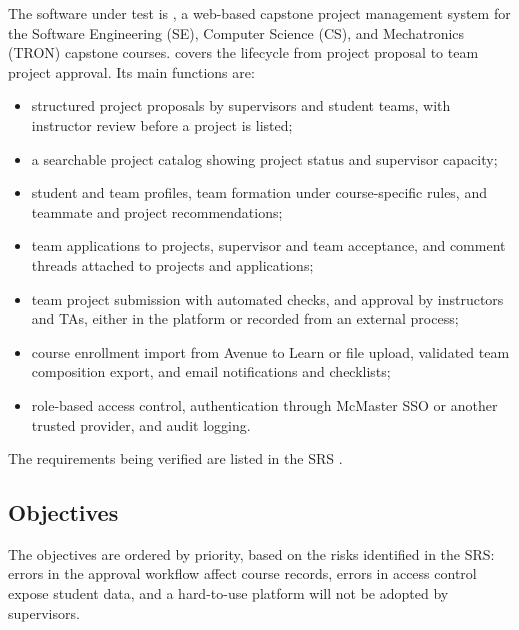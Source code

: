 \documentclass[12pt, titlepage]{article}
\begin{document}
The software under test is \projname{}, a web-based capstone project management system for the Software Engineering (SE), Computer Science (CS), and Mechatronics (TRON) capstone courses. \projname{} covers the lifecycle from project proposal to team project approval. Its main functions are:
\begin{itemize}
  \item structured project proposals by supervisors and student teams, with instructor review before a project is listed;
  \item a searchable project catalog showing project status and supervisor capacity;
  \item student and team profiles, team formation under course-specific rules, and teammate and project recommendations;
  \item team applications to projects, supervisor and team acceptance, and comment threads attached to projects and applications;
  \item team project submission with automated checks, and approval by instructors and TAs, either in the platform or recorded from an external process;
  \item course enrollment import from Avenue to Learn or file upload, validated team composition export, and email notifications and checklists;
  \item role-based access control, authentication through McMaster SSO or another trusted provider, and audit logging.
\end{itemize}
The requirements being verified are listed in the SRS \citep{SRS}.

\subsection{Objectives}


The objectives are ordered by priority, based on the risks identified in the SRS: errors in the approval workflow affect course records, errors in access control expose student data, and a hard-to-use platform will not be adopted by supervisors.
\end{document}
